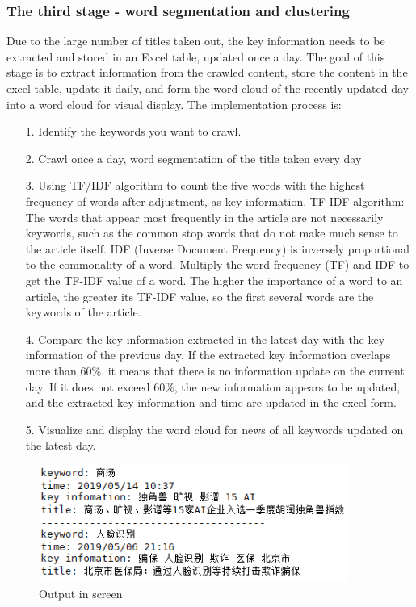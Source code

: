 \documentclass{article}
\begin{document}
\subsubsection{The third stage - word segmentation and clustering}
Due to the large number of titles taken out, the key information needs to be extracted and stored in an Excel table, updated once a day.
The goal of this stage is to extract information from the crawled content, store the content in the excel table, update it daily, and form the word cloud of the recently updated day into a word cloud for visual display.
The implementation process is:
\begin{itemize}
	\item[1.] Identify the keywords you want to crawl.
	\item[2.] Crawl once a day, word segmentation of the title taken every day
	\item[3.] Using TF/IDF algorithm to count the five words with the highest frequency of words after adjustment, as key information. TF-IDF algorithm: The words that appear most frequently in the article are not necessarily keywords, such as the common stop words that do not make much sense to the article itself. IDF (Inverse Document Frequency) is inversely proportional to the commonality of a word. Multiply the word frequency (TF) and IDF to get the TF-IDF value of a word. The higher the importance of a word to an article, the greater its TF-IDF value, so the first several words are the keywords of the article.
	\item[4.] Compare the key information extracted in the latest day with the key information of the previous day. If the extracted key information overlaps more than 60\%, it means that there is no information update on the current day. If it does not exceed 60\%, the new information appears to be updated, and the extracted key information and time are updated in the excel form.
	\item[5.] Visualize and display the word cloud for news of all keywords updated on the latest day.
\end{itemize}

\begin{figure}[htb]
	\centering
	\includegraphics[width=4in]{output_screen.png}
	\caption{Output in screen}
\end{figure}
\end{document}
